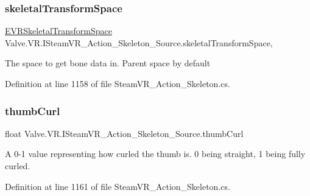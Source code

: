 \subsubsection{\texorpdfstring{skeletalTransformSpace}{skeletalTransformSpace}}
{\footnotesize\ttfamily \mbox{\hyperlink{namespace_valve_1_1_v_r_a916744fb3fc7b8e8ba224fba9bee6de4}{E\+V\+R\+Skeletal\+Transform\+Space}} Valve.\+V\+R.\+I\+Steam\+V\+R\+\_\+\+Action\+\_\+\+Skeleton\+\_\+\+Source.\+skeletal\+Transform\+Space\hspace{0.3cm}{\ttfamily [get]}, {\ttfamily [set]}}



The space to get bone data in. Parent space by default 



Definition at line 1158 of file Steam\+V\+R\+\_\+\+Action\+\_\+\+Skeleton.\+cs.

\mbox{\label{interface_valve_1_1_v_r_1_1_i_steam_v_r___action___skeleton___source_a0d7a2a786bcba05e32bcdc2c37e397a6}} 
\subsubsection{\texorpdfstring{thumbCurl}{thumbCurl}}
{\footnotesize\ttfamily float Valve.\+V\+R.\+I\+Steam\+V\+R\+\_\+\+Action\+\_\+\+Skeleton\+\_\+\+Source.\+thumb\+Curl\hspace{0.3cm}{\ttfamily [get]}}



A 0-\/1 value representing how curled the thumb is. 0 being straight, 1 being fully curled. 



Definition at line 1161 of file Steam\+V\+R\+\_\+\+Action\+\_\+\+Skeleton.\+cs.

\mbox{\label{interface_valve_1_1_v_r_1_1_i_steam_v_r___action___skeleton___source_a64b2ba19df21ca74bc15bb9d44351824}} 
